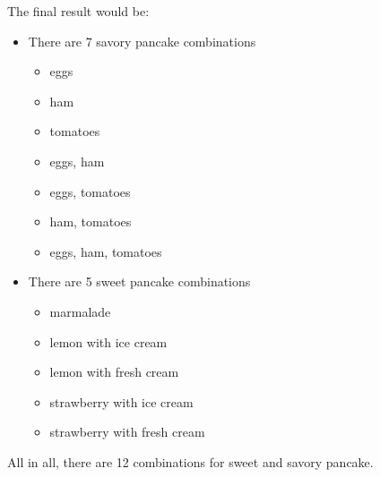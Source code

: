 \documentclass[12pt,titlepage]{article}
\begin{document}
\begin{enumerate}
{        The final result would be:
        \begin{itemize}
            \item {
                There are 7 savory pancake combinations
                \begin{itemize}
                    \item eggs
                    \item ham
                    \item tomatoes
                    \item eggs, ham
                    \item eggs, tomatoes
                    \item ham, tomatoes
                    \item eggs, ham, tomatoes
                \end{itemize}
            }
            \item {
                There are 5 sweet pancake combinations
                \begin{itemize}
                    \item marmalade
                    \item lemon with ice cream
                    \item lemon with fresh cream
                    \item strawberry with ice cream
                    \item strawberry with fresh cream
                \end{itemize}
            }
        \end{itemize}

        All in all, there are 12 combinations for sweet and savory pancake.
    }
\end{enumerate}
\end{document}
